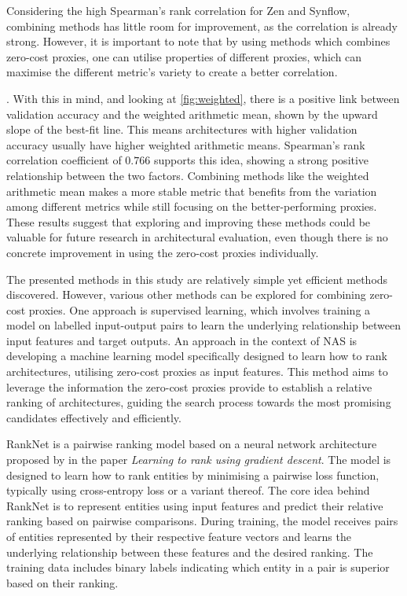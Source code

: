 Considering the high Spearman's rank correlation for Zen and \gls{Synflow}, combining methods has little room for improvement, as the correlation is already strong. However, it is important to note that by using methods which combines zero-cost proxies, one can utilise properties of different proxies, which can maximise the different metric's variety to create a better correlation. \begin{comment}    
It is important to note that using the majority vote and weighted arithmetic mean helps maximise the different metrics' variety to create a better correlation.
\end{comment}. With this in mind, and looking at \cref{fig:weighted}, there is a positive link between validation accuracy and the weighted arithmetic mean, shown by the upward slope of the best-fit line. This means architectures with higher validation accuracy usually have higher weighted arithmetic means. Spearman's rank correlation coefficient of $0.766$ supports this idea, showing a strong positive relationship between the two factors. Combining methods like the weighted arithmetic mean makes a more stable metric that benefits from the variation among different metrics while still focusing on the better-performing proxies. These results suggest that exploring and improving these methods could be valuable for future research in architectural evaluation, even though there is no concrete improvement in using the zero-cost proxies individually. 

The presented methods in this study are relatively simple yet efficient methods discovered. However, various other methods can be explored for combining zero-cost proxies. One approach is supervised learning,  which involves training a model on labelled input-output pairs to learn the underlying relationship between input features and target outputs. An approach in the context of \gls{NAS} is developing a machine learning model specifically designed to learn how to rank architectures, utilising zero-cost proxies as input features. This method aims to leverage the information the zero-cost proxies provide to establish a relative ranking of architectures, guiding the search process towards the most promising candidates effectively and efficiently. 

RankNet is a pairwise ranking model based on a neural network architecture proposed by \cite{burges2005learning} in the paper \textit{Learning to rank using gradient descent}. The model is designed to learn how to rank entities by minimising a pairwise loss function, typically using cross-entropy loss or a variant thereof. The core idea behind RankNet is to represent entities using input features and predict their relative ranking based on pairwise comparisons. During training, the model receives pairs of entities represented by their respective feature vectors and learns the underlying relationship between these features and the desired ranking. The training data includes binary labels indicating which entity in a pair is superior based on their ranking.

